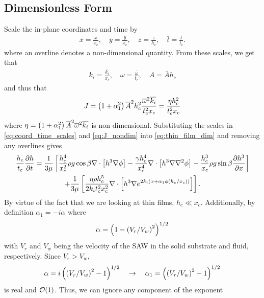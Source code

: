 \subsection{Dimensionless Form}
Scale the in-plane coordinates and time by 
\begin{gather}
    \bar{x} = \frac{x}{x_c}, \quad \bar{y} = \frac{y}{x_c}, \quad \bar{z} = \frac{z}{h_c}, \quad \bar{t} = \frac{t}{t_c}. 
    \label{eq:coord_time_scales}
\end{gather}
where an overline denotes a non-dimensional quantity. From these scales, we get that  
\begin{gather*}
    k_i = \frac{\bar{k_i}}{x_c}, \quad \omega = \frac{\bar{\omega}}{t_c}, \quad A = \bar{A}h_c
\end{gather*}
and thus that 
\begin{align}
    J = \left( 1 + \alpha_1^2 \right)  \overline{A}^2 h_c^2 \frac{\overline{\omega}^2 \overline{k_i}}{t_c^2 x_c} = \frac{\eta h_c^2}{t_c^2 x_c}
    \label{eq:J_nondim}
\end{align}
where $\eta = \left( 1 + \alpha_1^2 \right)  \overline{A}^2 \overline{\omega}^2 \overline{k_i}$ is non-dimensional. Substituting the scales in 
\cref{eq:coord_time_scales} and \cref{eq:J_nondim} into \cref{eq:thin_film_dim} and removing any overlines gives 
\begin{multline}
    \frac{h_c}{t_c} \frac{\partial h}{\partial t} = \frac{1}{3\mu} \left[ 
        \frac{h_c^4}{x_c^2} \rho g \cos \beta \nabla \cdot \left[ h^3\nabla\phi \right] - 
        \frac{\gamma h_c^4}{x_c^4} \nabla \cdot \left[ h^3 \nabla \nabla^2 \phi \right] - 
        \frac{h_c^3}{x_c} \rho g \sin\beta \frac{\partial h^3}{\partial x}
     \right]\\
    + \frac{1}{3\mu} \left[  
        \frac{\eta \rho h_c^5}{2k_i t_c^2 x_c^2} \nabla \cdot \left[ h^3 \nabla e^{2k_i \left( x + \alpha_1 \phi \left( h_c/x_c \right) \right)} \right]
     \right].
    \label{eq:nondim_first}
\end{multline}
By virtue of the fact that we are looking at thin films, $h_c \ll x_c$. Additionally, by definition
$\alpha_1 = -i \alpha$ where 
\begin{equation*}
    \alpha = \left( 1 - \left( V_r/V_w \right)^2 \right)^{1/2}
\end{equation*}
with $V_r$ and $V_w$ being the velocity of the SAW in the solid substrate and fluid, respectively. Since 
$V_r > V_w$, 
\begin{equation*}
    \alpha = i \left( \left( V_r/V_w \right)^2 - 1 \right)^{1/2} \quad \rightarrow \quad \alpha_1 = \left( \left( V_r/V_w \right)^2 - 1 \right)^{1/2}
\end{equation*}
is real and $\operatorname{\mathcal{O}}\!\left(1\right)$. Thus, we can ignore any component of the exponent 
